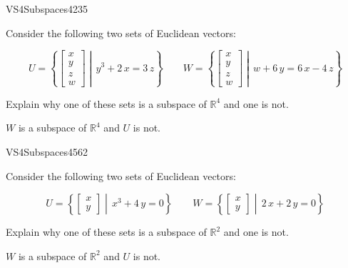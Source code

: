 \begin{exercise}{VS4}{Subspaces}{4235} 
\begin{exerciseStatement} 

Consider the following two sets of Euclidean vectors: 

 \[
          U=\left\{ \left[\begin{array}{c}
x \\
y \\
z \\
w
\end{array}\right] \middle|\,y^{3} + 2 \, x = 3 \, z\right\} \hspace{2em}  W=\left\{ \left[\begin{array}{c}
x \\
y \\
z \\
w
\end{array}\right] \middle|\,w + 6 \, y = 6 \, x - 4 \, z\right\}
    \] 

 Explain why one of these sets is a subspace of \(\mathbb{R}^4\) and one is not. 

 \end{exerciseStatement}
 \begin{exerciseAnswer} 

\(W\) is a subspace of \(\mathbb{R}^4\) and \(U\) is not.

 \end{exerciseAnswer}
 \end{exercise}


\begin{exercise}{VS4}{Subspaces}{4562} 
\begin{exerciseStatement} 

Consider the following two sets of Euclidean vectors: 

 \[
          U=\left\{ \left[\begin{array}{c}
x \\
y
\end{array}\right] \middle|\,x^{3} + 4 \, y = 0\right\} \hspace{2em}  W=\left\{ \left[\begin{array}{c}
x \\
y
\end{array}\right] \middle|\,2 \, x + 2 \, y = 0\right\}
    \] 

 Explain why one of these sets is a subspace of \(\mathbb{R}^2\) and one is not. 

 \end{exerciseStatement}
 \begin{exerciseAnswer} 

\(W\) is a subspace of \(\mathbb{R}^2\) and \(U\) is not.

 \end{exerciseAnswer}
 \end{exercise}


